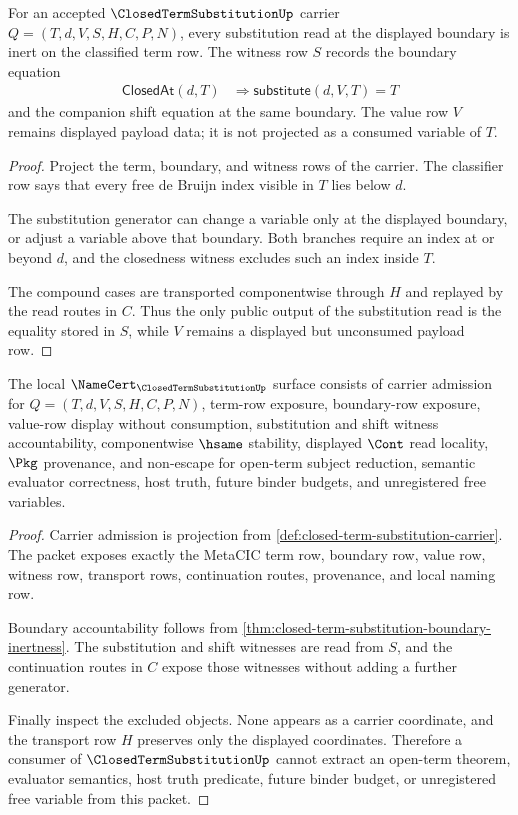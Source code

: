 \begin{theorem}
\label{thm:closed-term-substitution-boundary-inertness}
For an accepted $\ClosedTermSubstitutionUp$ carrier $Q=(T,d,V,S,H,C,P,N)$, every substitution read at the displayed boundary is inert on the classified term row. The witness row $S$ records the boundary equation
$$
\begin{aligned}
  \mathsf{ClosedAt}(d,T)
  &\Rightarrow
  \mathsf{substitute}(d,V,T)=T
\end{aligned}
$$
and the companion shift equation at the same boundary. The value row $V$ remains displayed payload data; it is not projected as a consumed variable of $T$.
\end{theorem}
\begin{proof}
Project the term, boundary, and witness rows of the carrier. The classifier row says that every free de Bruijn index visible in $T$ lies below $d$.

The substitution generator can change a variable only at the displayed boundary, or adjust a variable above that boundary. Both branches require an index at or beyond $d$, and the closedness witness excludes such an index inside $T$.

The compound cases are transported componentwise through $H$ and replayed by the read routes in $C$. Thus the only public output of the substitution read is the equality stored in $S$, while $V$ remains a displayed but unconsumed payload row.
\end{proof}

\begin{theorem}
\label{thm:closed-term-substitution-namecert-obligations}
The local $\NameCert_{\ClosedTermSubstitutionUp}$ surface consists of carrier admission for $Q=(T,d,V,S,H,C,P,N)$, term-row exposure, boundary-row exposure, value-row display without consumption, substitution and shift witness accountability, componentwise $\hsame$ stability, displayed $\Cont$ read locality, $\Pkg$ provenance, and non-escape for open-term subject reduction, semantic evaluator correctness, host truth, future binder budgets, and unregistered free variables.
\end{theorem}
\begin{proof}
Carrier admission is projection from \autoref{def:closed-term-substitution-carrier}. The packet exposes exactly the MetaCIC term row, boundary row, value row, witness row, transport rows, continuation routes, provenance, and local naming row.

Boundary accountability follows from \autoref{thm:closed-term-substitution-boundary-inertness}. The substitution and shift witnesses are read from $S$, and the continuation routes in $C$ expose those witnesses without adding a further generator.

Finally inspect the excluded objects. None appears as a carrier coordinate, and the transport row $H$ preserves only the displayed coordinates. Therefore a consumer of $\ClosedTermSubstitutionUp$ cannot extract an open-term theorem, evaluator semantics, host truth predicate, future binder budget, or unregistered free variable from this packet.
\end{proof}

